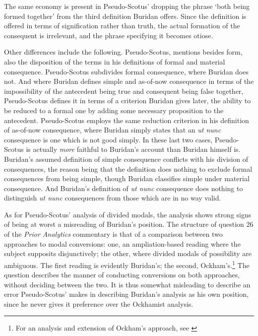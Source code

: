 \documentclass[]{article}
\begin{document}
The same economy is present in Pseudo-Scotus' dropping the phrase `both being formed together' from the third definition Buridan offers. Since the definition is offered in terms of signification rather than truth, the actual formation of the consequent is irrelevant, and the phrase specifying it becomes otiose.

Other differences include the following. Pseudo-Scotus, mentions besides form, also the disposition of the terms in his definitions of formal and material consequence. Pseudo-Scotus subdivides formal consequence, where Buridan does not. And where Buridan defines simple and as-of-now consequence in terms of the impossibility of the antecedent being true and consequent being false together, Pseudo-Scotus defines it in terms of a criterion Buridan gives later, the ability to be reduced to a formal one by adding some necessary proposition to the antecedent. Pseudo-Scotus employs the same reduction criterion in his definition of as-of-now consequence, where Buridan simply states that an \textit{ut nunc} consequence is one which is not good simply. In these last two cases, Pseudo-Scotus is actually \textit{more} faithful to Buridan's account than Buridan himself is. Buridan's assumed definition of simple consequence conflicts with his division of consequences, the reason being that the definition does nothing to exclude formal consequences from being simple, though Buridan classifies simple under material consequence. And Buridan's definition of \textit{ut nunc} consequence does nothing to distinguish \textit{ut nunc} consequences from those which are in no way valid.

As for Pseudo-Scotus' analysis of divided modals, the analysis shows strong signs of being at worst a misreading of Buridan's position. The structure of question 26 of the \textit{Prior Analytics} commentary is that of a comparison between two approaches to modal conversions: one, an ampliation-based reading where the subject supposits disjunctively; the other, where divided modals of possibility are ambiguous. The first reading is evidently Buridan's; the second, Ockham's.\footnote{For an analysis and extension of Ockham's approach, see \cite{Archambault2017c}} The question describes the manner of conducting conversions on both approaches, without deciding between the two. It is thus somewhat misleading to describe an error Pseudo-Scotus' makes in describing Buridan's analysis as his own position, since he never gives it preference over the Ockhamist analysis.
\end{document}
